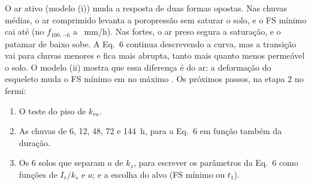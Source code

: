 \documentclass[11pt,a4paper]{article}
\begin{document}
O ar ativo (modelo (i)) muda a resposta de duas formas opostas. Nas chuvas médias, o ar comprimido levanta a poropressão
sem saturar o solo, e o FS mínimo cai até \quedaCem{} (no $f_{100,-6}$ a \quedaCemI~mm/h). Nas fortes, o ar preso
segura a saturação, e o patamar de baixo sobe. A Eq.~6 continua descrevendo a curva, mas a transição vai para chuvas
menores e fica mais abrupta, tanto mais quanto menos permeável o solo. O modelo (ii) mostra que essa diferença é do ar:
a deformação do esqueleto muda o FS mínimo em no máximo . Os próximos passos, na etapa 2 no fermi:
\begin{enumerate}
  \item O teste do piso de $k_{ra}$.
  \item As chuvas de 6, 12, 48, 72 e 144~h, para a Eq.~6 em função também da duração.
  \item Os 6 solos que separam $a$ de $k_s$, para escrever os parâmetros da Eq.~6 como funções de $I_r/k_s$ e $a$; e a
    escolha do alvo (FS mínimo ou $t_1$).
\end{enumerate}
\end{document}
